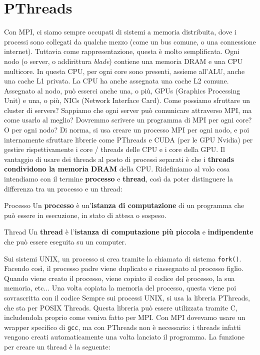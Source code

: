 \chapter{PThreads}
Con MPI, ci siamo sempre occupati di sistemi a memoria distribuita, dove i processi sono collegati da qualche mezzo (come un bus comune, o una connessione internet). Tuttavia come rappresentazione, questa è molto semplificata.
\nl
Ogni nodo (o server, o addirittura \textit{blade}) contiene una memoria DRAM e una CPU multicore. In questa CPU, per ogni core sono presenti, assieme all'ALU, anche una cache L1 privata. La CPU ha anche assegnata una cache L2 comune. Assegnato al nodo, può esserci anche una, o più, GPUs (Graphics Processing Unit) e una, o più, NICs (Network Interface Card).
\nl
Come possiamo sfruttare un cluster di servers? Sappiamo che ogni server può comunicare attraverso MPI, ma come usarlo al meglio? Dovremmo scrivere un programma di MPI per ogni core? O per ogni nodo?
\nl
Di norma, si usa creare un processo MPI per ogni nodo, e poi internamente sfruttare librerie come PThreads e CUDA (per le GPU Nvidia) per gestire rispettivamente i core / threads delle CPU e i core della GPU. Il vantaggio di usare dei threads al posto di processi separati è che i \textbf{threads condividono la memoria DRAM} della CPU.
\nl
Ridefiniamo al volo cosa intendiamo con il termine \textbf{processo} e \textbf{thread}, così da poter distinguere la differenza tra un processo e un thread:

\begin{definition}{Processo}
    Un \textbf{processo} è un'\textbf{istanza di computazione} di un programma che può essere in esecuzione, in stato di attesa o sospeso.
\end{definition}

\begin{definition}{Thread}
    Un \textbf{thread} è l'\textbf{istanza di computazione più piccola} e \textbf{indipendente} che può essere eseguita su un computer.
\end{definition}

Sui sistemi UNIX, un processo si crea tramite la chiamata di sistema \verb|fork()|. Facendo così, il processo padre viene duplicato e riassegnato al processo figlio. Quando viene creato il processo, viene copiato il codice del processo, la sua memoria, etc... Una volta copiata la memoria del processo, questa viene poi sovrascritta con il codice
\nl
Sempre sui processi UNIX, si usa la libreria PThreads, che sta per POSIX Threads. Questa libreria può essere utilizzata tramite C, includendola proprio come veniva fatto per MPI.
\nl
Con MPI dovevamo usare un wrapper specifico di \verb|gcc|, ma con PThreads non è necessario: i threads infatti vengono creati automaticamente una volta lanciato il programma. La funzione per creare un thread è la seguente:

